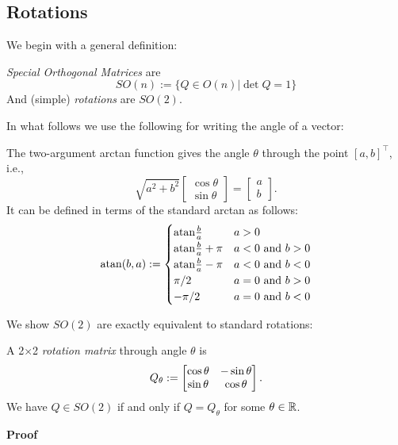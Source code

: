 \subsection{Rotations}
We begin with a general definition:

\begin{definition} \emph{Special Orthogonal Matrices} are
\[
SO(n) := \{Q \ensuremath{\in} O(n) | \det Q = 1 \}
\]
And (simple) \emph{rotations} are $SO(2)$. \end{definition}

In what follows we use the following for writing the angle of a vector:

\begin{definition} The two-argument arctan function gives the angle \texttt{\ensuremath{\theta}} through the point $[a,b]^\ensuremath{\top}$, i.e., 
\[
\sqrt{a^2 + b^2} \begin{bmatrix} \cos \ensuremath{\theta} \\ \sin \ensuremath{\theta} \end{bmatrix} =  \begin{bmatrix} a \\ b \end{bmatrix}.
\]
It can be defined in terms of the standard arctan as follows:
\[
{\rm atan}(b,a) := \begin{cases} {\rm atan}{b \over a} & a > 0 \\
                            {\rm atan}{b \over a} + \ensuremath{\pi} & a < 0\hbox{ and }b >0 \\
                            {\rm atan}{b \over a} - \ensuremath{\pi} & a < 0\hbox{ and }b < 0 \\
                            \ensuremath{\pi}/2 & a = 0\hbox{ and }b >0 \\
                            -\ensuremath{\pi}/2 & a = 0\hbox{ and }b < 0 
                            \end{cases}
\]
\end{definition}

We show $SO(2)$ are exactly equivalent to standard rotations:

\begin{proposition} A 2\ensuremath{\times}2 \emph{rotation matrix} through angle $\ensuremath{\theta}$ is
\[
Q_\ensuremath{\theta} := \begin{bmatrix} \cos \ensuremath{\theta} & -\sin \ensuremath{\theta} \cr \sin \ensuremath{\theta} & \cos \ensuremath{\theta} \end{bmatrix}.
\]
We have $Q \ensuremath{\in} SO(2)$ if and only if $Q = Q_\ensuremath{\theta}$ for some $\theta \in {\mathbb R}$.

\end{proposition}
\textbf{Proof}

